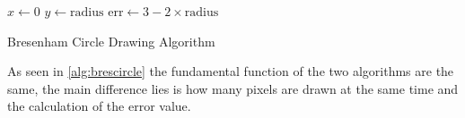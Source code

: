 \begin{algorithm}
	\SetAlgoLined
	\(x \gets 0\)\;
	\(y \gets \text{radius}\)\;
	\(\text{err} \gets 3 - 2 \times \text{radius}\)\;
	\caption{Bresenham Circle Drawing Algorithm}
	\label{alg:brescircle}
\end{algorithm}

As seen in \cref{alg:brescircle} the fundamental function of the two algorithms are the same, the main difference lies is how many pixels are drawn at the same time and the calculation of the error value.


